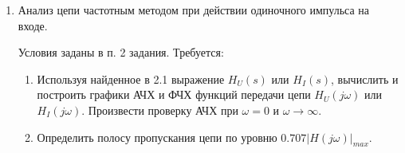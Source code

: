 \begin{enumerate}[label*=\arabic*.]
\item Анализ цепи частотным методом 
при действии одиночного импульса на входе.

Условия заданы в п. 2 задания. 
Требуется:

\begin{enumerate}[label*=\arabic*.]
    \item Используя найденное в 2.1 выражение 
    $ H_U(s) $ или $ H_I(s) $, 
    вычислить и построить графики АЧХ и ФЧХ функций передачи цепи 
    $ H_U(j\omega) $ или $ H_I(j\omega) $.
    Произвести проверку АЧХ при $ \omega = 0 $ и $ \omega \rightarrow \infty $.
    \item Определить полосу пропускания цепи по уровню 
    $ 0.707|H(j\omega)|_{max} $.
\end{enumerate}

\end{enumerate}
